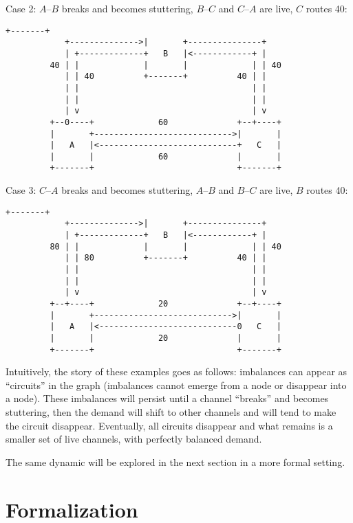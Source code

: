 \documentclass[a4paper]{article}
\begin{document}
Case 2: $A$--$B$ breaks and becomes stuttering, $B$--$C$ and $C$--$A$ are live, $C$ routes 40:
\begin{Verbatim}[samepage=true]
                            +-------+
            +-------------->|       +---------------+
            | +-------------+   B   |<------------+ |
         40 | |             |       |             | | 40
            | | 40          +-------+          40 | |
            | |                                   | |
            | |                                   | |
            | v                                   | v
         +--0----+             60              +--+----+
         |       +---------------------------->|       |
         |   A   |<----------------------------+   C   |
         |       |             60              |       |
         +-------+                             +-------+
\end{Verbatim}

Case 3: $C$--$A$ breaks and becomes stuttering, $A$--$B$ and $B$--$C$ are live, $B$ routes 40:
\begin{Verbatim}[samepage=true]
                            +-------+
            +-------------->|       +---------------+
            | +-------------+   B   |<------------+ |
         80 | |             |       |             | | 40
            | | 80          +-------+          40 | |
            | |                                   | |
            | |                                   | |
            | v                                   | v
         +--+----+             20              +--+----+
         |       +---------------------------->|       |
         |   A   |<----------------------------0   C   |
         |       |             20              |       |
         +-------+                             +-------+
\end{Verbatim}

Intuitively, the story of these examples goes as follows: imbalances can appear as ``circuits'' in the graph (imbalances cannot emerge from a node or disappear into a node). These imbalances will persist until a channel ``breaks'' and becomes stuttering, then the demand will shift to other channels and will tend to make the circuit disappear. Eventually, all circuits disappear and what remains is a smaller set of live channels, with perfectly balanced demand.

The same dynamic will be explored in the next section in a more formal setting.

\section{Formalization}\label{sec_formalization}
\end{document}
